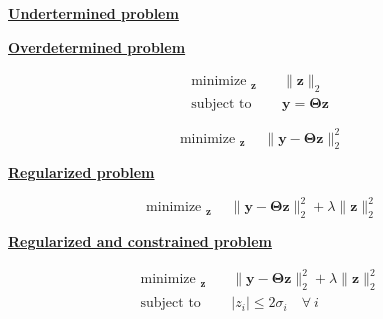 \documentclass[aspectratio=169, usenames, dvipsnames]{beamer}
\DeclareMathOperator*{\minimize}{minimize~}
\DeclareMathOperator*{\subto}{subject~to~}
\begin{document}
\begin{frame}
  \vfill
  \begin{minipage}{.48\textwidth}
    \centering
    \underline{\textbf{Undertermined problem}}
  \end{minipage}%
  \hfill
  \begin{minipage}{.48\textwidth}
    \centering
    \underline{\textbf{Overdetermined problem}}
  \end{minipage}

  \bigskip

  \begin{minipage}{.48\textwidth}
    \large
    \[
    \begin{aligned}
      \minimize_{\bm{z}} & \quad \| \bm{z} \|_2 \\
      \subto & \quad \bm{y} = \boldsymbol{\Theta} \bm{z}
    \end{aligned}
    \]
  \end{minipage}%
  \hfill
  \begin{minipage}{.48\textwidth}
    \large
    \[
    \minimize_{\bm{z}} \quad \| \bm{y} - \boldsymbol{\Theta} \bm{z} \|_2^2
    \]
  \end{minipage}

  \vfill
\end{frame}

\begin{frame}
  \vfill
  \centering
  \underline{\textbf{Regularized problem}}


  \large
  \[
  \minimize_{\bm{z}} \quad \| \bm{y} - \boldsymbol{\Theta} \bm{z} \|_2^2 + \lambda \| \bm{z} \|_2^2
  \]
  \vfill
\end{frame}

\begin{frame}
  \vfill
  \centering
  \underline{\textbf{Regularized and constrained problem}}


  \large
  \[
  \begin{aligned}
    \minimize_{\bm{z}} & \quad \| \bm{y} - \boldsymbol{\Theta} \bm{z} \|_2^2 + \lambda \| \bm{z} \|_2^2 \\
    \subto & \quad \vert z_i \vert \leq 2 \sigma_i \quad \forall \ i
  \end{aligned}
  \]
  \vfill
\end{frame}
\end{document}
